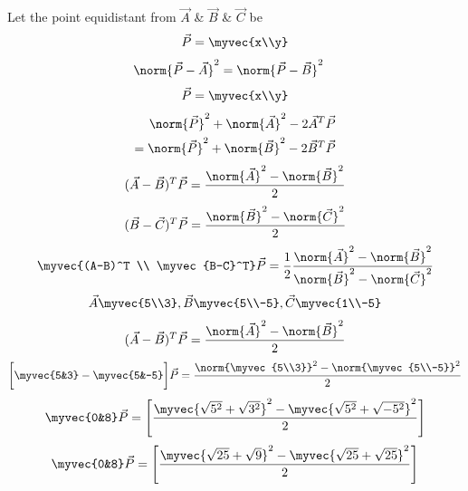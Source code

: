 \documentclass[journal,12pt,twocolumn]{IEEEtran}
\begin{document}
Let the point equidistant from $\Vec{A}$ \& $\Vec{B}$ \& $\Vec{C}$ be 
\begin{align}
    \Vec{P}=\myvec{x\\y}
\end{align}
\begin{align}
    \norm{\Vec{P}-\vec{A}}^2 &= \norm{\vec{P}-\vec{B}}^2
\end{align}
\begin{align}
        \Vec{P}=\myvec{x\\y}
    \end{align}
\begin{align}
    \norm{\vec{P}}^2 + \norm{\vec{A}}^2 -2\vec{A}^T\vec{P}\\ = \norm{\vec{P}}^2 + \norm{\vec{B}}^2 -2\vec{B}^T\vec{P}
\end{align}
\begin{align}
    (\vec{A}-\vec{B})^T\vec{P} = \frac{\norm{\vec{A}}^2-\norm{\vec{B}}^2}{{2}}
\end{align}
\begin{align}
    (\vec{B}-\vec{C})^T\vec{P} = \frac{\norm{\vec{B}}^2-\norm{\vec{C}}^2}{{2}}
\end{align}
\begin{align}
   \myvec{(A-B)^T \\ \myvec{B-C}^T}\vec{P} = \frac{1}{2}\frac{\norm{\vec{A}}^2-\norm{\vec{B}}^2}{\norm{\vec{B}}^2-\norm{\vec{C}}^2}
\end{align}
\begin{align}
    \Vec{A}\myvec{5\\3},\Vec{B}\myvec{5\\-5},\Vec{C}\myvec{1\\-5}    \end{align}
\begin{align}
    (\vec{A}-\vec{B})^T\vec{P} = \frac{\norm{\vec{A}}^2-\norm{\vec{B}}^2}{{2}}
\end{align} 
\begin{align}
    \bigg[\myvec{5&3} - \myvec{5&-5}\bigg]\vec{P}= \frac{\norm{\myvec{5\\3}}^2-\norm{\myvec{5\\-5}}^2}{2}
\end{align}
    \begin{align}
        \myvec{0&8}\vec{P}=\Bigg[\frac{\myvec{\sqrt{5^2}+\sqrt{3^2}}^2 -\myvec{\sqrt{5^2}+\sqrt{-5^2}}^2}{2}\Bigg]
    \end{align}
    \begin{align}
        \myvec{0&8}\vec{P}=\Bigg[\frac{\myvec{\sqrt{25}+\sqrt{9}}^2 -\myvec{\sqrt{25}+\sqrt{25}}^2}{2}\Bigg]
    \end{align}
\end{document}
